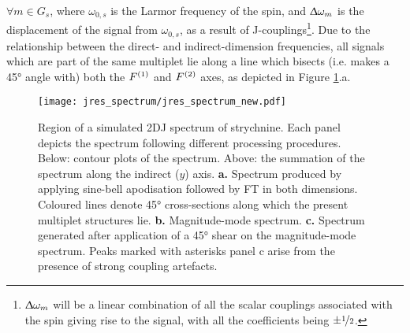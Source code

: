 $\forall m \in G_s$, where $\omega_{0,s}$ is the Larmor frequency of
the spin, and $\Updelta \omega_m$ is the displacement
of the signal from $\omega_{0,s}$, as a result of J-couplings\footnote{
    $\Updelta \omega_m$ will be a linear combination of all the scalar
    couplings associated with the spin giving rise to the signal, with all the
    coefficients being $\pm \nicefrac{1}{2}$.
}. Due to the relationship between the direct- and indirect-dimension
frequencies, all signals which are part of the same multiplet lie along
a line which bisects (i.e. makes a \ang{45} angle with) both the $F^{(1)}$ and
$F^{(2)}$ axes, as depicted in Figure \ref{fig:jres_spectrum}.a.
\begin{figure}%
    \centering%
    \texttt{[image: jres\_spectrum/jres\_spectrum\_new.pdf]}%
    \caption[
        Region of a \acs{2DJ} spectrum of strychnine.
    ]
    {%
        Region of a simulated \acs{2DJ} spectrum of strychnine.
        Each panel depicts the spectrum following different processing
        procedures. Below: contour plots of the spectrum. Above: the
        summation of the spectrum along the indirect ($y$) axis.
        \textbf{a.} Spectrum produced by applying sine-bell apodisation
        followed by \ac{FT} in both dimensions.
        Coloured lines denote \ang{45} cross-sections along which the present
        multiplet structures lie.
        \textbf{b.} Magnitude-mode spectrum.
        \textbf{c.} Spectrum generated after application of a \ang{45} shear on
        the magnitude-mode spectrum. Peaks marked with asterisks panel c arise
        from the presence of strong coupling artefacts.
   }%
    \label{fig:jres_spectrum}%
\end{figure}%

